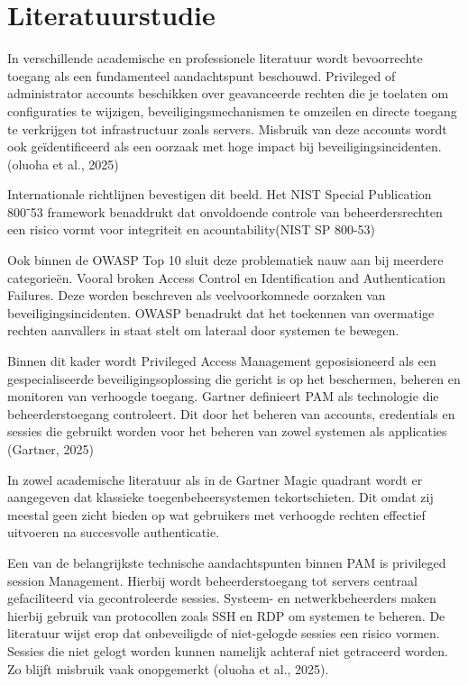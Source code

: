 
\section{Literatuurstudie}%
\label{sec:literatuurstudie}

In verschillende academische en professionele literatuur wordt bevoorrechte toegang als een fundamenteel aandachtspunt beschouwd. Privileged of administrator accounts beschikken over geavanceerde rechten die je toelaten om configuraties te wijzigen, beveiligingsmechanismen te omzeilen en directe toegang te verkrijgen tot infrastructuur zoals servers. Misbruik van deze accounts wordt ook geïdentificeerd als een oorzaak met hoge impact bij beveiligingsincidenten. (oluoha et al., 2025)

Internationale richtlijnen bevestigen dit beeld. Het NIST Special Publication 800⁻53 framework benaddrukt dat onvoldoende controle van beheerdersrechten een risico vormt voor integriteit en acountability(NIST SP 800-53)

Ook binnen de OWASP Top 10 sluit deze problematiek nauw aan bij meerdere categorieën. Vooral broken Access Control en Identification and Authentication Failures. Deze worden beschreven als veelvoorkomnede oorzaken van beveiligingsincidenten. OWASP benadrukt dat het toekennen van overmatige rechten aanvallers in staat stelt om lateraal door systemen te bewegen. 

Binnen dit kader wordt Privileged Access Management geposisioneerd als een gespecialiseerde beveiligingsoplossing die gericht is op het beschermen, beheren en monitoren van verhoogde toegang. Gartner definieert PAM als technologie die beheerderstoegang controleert. Dit door het beheren van accounts, credentials en sessies die gebruikt worden voor het beheren van zowel systemen als applicaties (Gartner, 2025)

In zowel academische literatuur als in de Gartner Magic quadrant wordt er aangegeven dat klassieke toegenbeheersystemen tekortschieten. Dit omdat zij meestal geen zicht bieden op wat gebruikers met verhoogde rechten effectief uitvoeren na succesvolle authenticatie.

Een van de belangrijkste technische aandachtspunten binnen PAM is privileged session Management. Hierbij wordt beheerderstoegang tot servers centraal gefaciliteerd via gecontroleerde sessies. Systeem- en netwerkbeheerders maken hierbij gebruik van protocollen zoals SSH en RDP om systemen te beheren. De literatuur wijst erop dat onbeveiligde of niet-gelogde sessies een risico vormen. Sessies die niet gelogt worden kunnen namelijk achteraf niet getraceerd worden. Zo blijft misbruik vaak onopgemerkt (oluoha et al., 2025).

